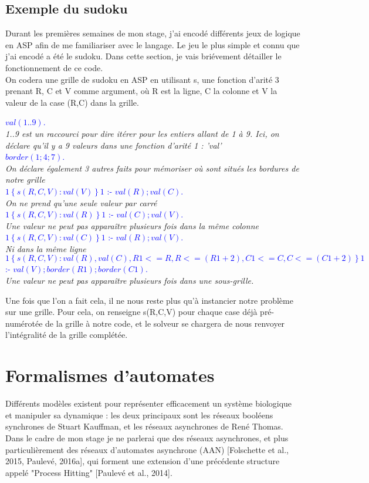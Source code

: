\documentclass[12pt,a4paper]{article}
\begin{document}
\subsection{Exemple du sudoku}
Durant les premières semaines de mon stage, j'ai encodé différents jeux de logique en ASP afin de me familiariser avec le langage. Le jeu le plus simple et connu que j'ai encodé a été le sudoku. Dans cette section, je vais 
briévement détailler le fonctionnement de ce code.\\
On codera une grille de sudoku en ASP en utilisant s, une fonction d'arité 3 prenant R, C et V comme argument, où R est la ligne, C la colonne et V la valeur de la case (R,C) dans la grille.
\begin{center}
\textcolor{blue}{
	$val(1..9)$.\\
}
\emph{1..9 est un raccourci pour dire itérer pour les entiers allant de 1 à 9. Ici, on déclare qu'il y a 9 valeurs dans une fonction d'arité 1 : 'val'}\\
\textcolor{blue}{
	$border(1;4;7)$.\\
}
\emph{On déclare également 3 autres faits pour mémoriser où sont situés les bordures de notre grille}\\
\textcolor{blue}{
	$1\left\{ s(R,C,V): val(V) \right\}1$ :- $val(R) ; val(C)$.\\
}
\emph{On ne prend qu'une seule valeur par carré}\\
\textcolor{blue}{
	$1\left\{ s(R,C,V): val(R) \right\}1$ :- $val(C) ; val(V)$.\\
}
\emph{Une valeur ne peut pas apparaître plusieurs fois dans la même colonne}\\
\textcolor{blue}{
	$1\left\{ s(R,C,V): val(C) \right\}1$ :- $val(R) ; val(V)$.\\
}
\emph{Ni dans la même ligne}\\
\textcolor{blue}{
	$1\left\{ s(R,C,V): val(R), val(C), R1<=R, R<=(R1+2), C1<=C, C<=(C1+2)\right\}1$ :- $val(V) ; border(R1) ; border(C1)$.\\
}
\emph{Une valeur ne peut pas apparaître plusieurs fois dans une sous-grille.}\\
\end{center}
Une fois que l'on a fait cela, il ne nous reste plus qu'à instancier notre problème sur une grille. Pour cela, on renseigne s(R,C,V) pour chaque case déjà pré-numérotée de la grille à notre code, et le solveur se chargera 
de nous renvoyer l'intégralité de la grille complétée.

\section{Formalismes d'automates}
Différents modèles existent pour représenter efficacement un système biologique et manipuler sa dynamique : les deux principaux sont les réseaux booléens synchrones de Stuart Kauffman, et les réseaux asynchrones de René Thomas.
Dans le cadre de mon stage je ne parlerai que des réseaux asynchrones, et plus particulièrement des réseaux d'automates asynchrone (AAN) [Folschette et al., 2015, Paulevé, 2016a], qui forment une extension d'une précédente 
structure appelé "Process Hitting"  [Paulevé et al., 2014].\\
\end{document}
